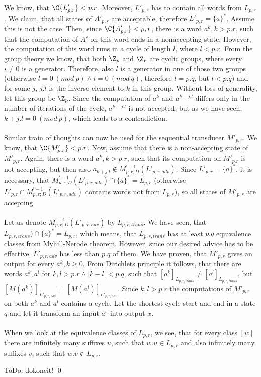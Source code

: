 \paragraph{}
We know, that $\C{L'_{p,r}} < p.r$. Moreover, $L'_{p,r}$ has to contain all words from $L_{p,r}$. We claim, that all states of $A'_{p,r}$ are acceptable, therefore $L'_{p,r} = \{a\}^*$. Assume this is not the case. Then, since $\C{A'_{p,r}} < p,r$, there is a word $a^k, k > p.r$, such that the computation of $A'$ on this word ends in a nonaccepting state. However, the computation of this word runs in a cycle of length $l$, where $l < p.r$. From the group theory we know, that both $\Z_{p}$ and $\Z_r$ are cyclic groups, where every $i \neq 0$ is a generator. Therefore, also $l$ is a generator in one of those two groups (otherwise $l = 0\ (mod\ p) \wedge i = 0\ (mod\ q)$, therefore $l = p.q$, but $l < p.q$) and for some $j$, $j.l$ is the inverse element to $k$ in this group. Without loss of generality, let this group be $\Z_p$. Since the computation of $a^k$ and $a^{k+j.l}$ differs only in the number of iterations of the cycle, $a^{k+j.l}$ is not accepted, but as we have seen, $k+j.l = 0\ (mod\ p)$, which leads to a contradiction.

\paragraph{}
Similar train of thoughts can now be used for the sequential transducer $M'_{p,r}$. We know, that $\C{M'_{p,r}} < p.r$. Now, assume that there is a non-accepting state of $M'_{p,r}$. Again, there is a word $a^k, k > p.r$, such that its computation on $M'_{p.r}$ is not accepting, but then also $a_{k+j.l} \notin M_{p,r;D}^{'-1}(L'_{p,r,adv})$. Since $L'_{p,r} = \{a\}^*$, it is necessary, that $M_{p,r;D}^{'-1}(L'_{p,r,adv}) \cap \{a\}^* = L_{p,r}$ (otherwise $L'_{p,r} \cap M_{p,r;D}^{'-1}(L'_{p,r,adv})$ contains words not from $L_{p,r}$), so all states of $M'_{p,r}$ are accepting.

\paragraph{}
Let us denote $M_{p,r;D}^{'-1}(L'_{p,r,adv})$ by $L_{p,r,trans}$. We have seen, that $L_{p,r,trans}) \cap \{a\}^* = L_{p,r}$, which means, that $L_{p,r,trans}$ has at least $p.q$ equivalence classes from Myhill-Nerode theorem. However, since our desired advice has to be effective, $L'_{p,r,adv}$ has less than $p.q$ of them. We have proven, that $M'_{p,r}$ gives an output for every $a^k, k \geq 0$. From Dirichlets principle it follows, that there are words $a^k, a^l$ for $k,l > p.r \wedge |k - l| < p.q$, such that $[a^k]_{L_{p,r,trans}} \neq [a^l]_{L_{p,r,trans}}$, but $[M(a^k)]_{L'_{p,r,adv}} = [M(a^l)]_{L'_{p,r,adv}}$. Since $k,l > p.r$ the computations of $M'_{p,r}$ on both $a^k$ and $a^l$ contains a cycle. Let the shortest cycle start and end in a state $q$ and let it transform an input $a^s$ into output $x$.

\paragraph{}
When we look at the equivalence classes of $L_{p,r}$, we see, that for every class $[w]$ there are infinitely many suffixes $u$, such that $w.u \in L_{p,r}$ and also infinitely many suffixes $v$, such that $w.v \notin L_{p,r}$. 

\color{red}ToDo: dokoncit!\color{black} \qed 

